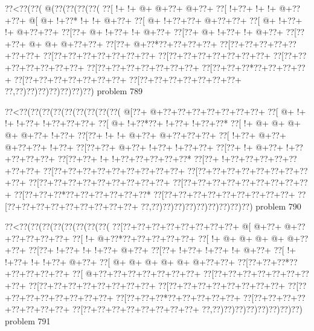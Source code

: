 \vbox{\vbox{\goo
\0??<\0??(\0??(\- @(\0??(\0??(\0??(\0??(
\0??[\- !+\- !+\- @+\- @+\0??+\- @+\0??+
\0??[\- !+\0??+\- !+\- !+\- @+\0??+\0??+
\- @[\- @+\- !+\0??*\- !+\- !+\- @+\0??+
\0??[\- @+\- !+\0??+\0??+\- @+\0??+\0??+
\0??[\- @+\- !+\0??+\- !+\- @+\0??+\0??+
\0??[\0??+\- @+\- !+\0??+\- !+\- @+\0??+
\0??[\0??+\- @+\- !+\0??+\- !+\- @+\0??+
\0??[\0??+\0??+\- @+\- @+\- @+\0??+\0??+
\0??[\0??+\- @+\0??*\0??+\0??+\0??+\0??+
\0??[\0??+\0??+\0??+\0??+\0??+\0??+\0??+
\0??[\0??+\0??+\0??+\0??+\0??+\0??+\0??+
\0??[\0??+\0??+\0??+\0??+\0??+\0??+\0??+
\0??[\0??+\0??+\0??+\0??+\0??+\0??+\0??+
\0??[\0??+\0??+\0??+\0??+\0??+\0??+\0??+
\0??[\0??+\0??+\0??*\0??+\0??+\0??+\0??+
\0??[\0??+\0??+\0??+\0??+\0??+\0??+\0??+
\0??[\0??+\0??+\0??+\0??+\0??+\0??+\0??+
\0??,\0??)\0??)\0??)\0??)\0??)\0??)\0??)
}
\hfil problem 789\hfil\break
}

\vbox{\vbox{\goo
\0??<\0??(\0??(\0??(\0??(\0??(\0??(\0??(\0??(\0??(
\- @[\0??+\- @+\0??+\0??+\0??+\0??+\0??+\0??+\0??+
\0??[\- @+\- !+\- !+\- !+\0??+\- !+\0??+\0??+\0??+
\0??[\- @+\- !+\0??*\0??+\- !+\0??+\- !+\0??+\0??*
\0??[\- !+\- @+\- @+\- @+\- @+\- @+\0??+\- !+\0??+
\0??[\0??+\- !+\- !+\- @+\0??+\- @+\0??+\0??+\0??+
\0??[\- !+\0??+\- @+\0??+\- @+\0??+\0??+\- !+\0??+
\0??[\0??+\0??+\- @+\0??+\- !+\0??+\- !+\0??+\0??+
\0??[\0??+\- !+\- @+\0??+\- !+\0??+\0??+\0??+\0??+
\0??[\0??+\0??+\- !+\- !+\0??+\0??+\0??+\0??+\0??*
\0??[\0??+\- !+\0??+\0??+\0??+\0??+\0??+\0??+\0??+
\0??[\0??+\0??+\0??+\0??+\0??+\0??+\0??+\0??+\0??+
\0??[\0??+\0??+\0??+\0??+\0??+\0??+\0??+\0??+\0??+
\0??[\0??+\0??+\0??+\0??+\0??+\0??+\0??+\0??+\0??+
\0??[\0??+\0??+\0??+\0??+\0??+\0??+\0??+\0??+\0??+
\0??[\0??+\0??+\0??*\0??+\0??+\0??+\0??+\0??+\0??*
\0??[\0??+\0??+\0??+\0??+\0??+\0??+\0??+\0??+\0??+
\0??[\0??+\0??+\0??+\0??+\0??+\0??+\0??+\0??+\0??+
\0??,\0??)\0??)\0??)\0??)\0??)\0??)\0??)\0??)\0??)
}
\hfil problem 790\hfil\break
}

\vbox{\vbox{\goo
\0??<\0??(\0??(\0??(\0??(\0??(\0??(\0??(\0??(
\0??[\0??+\0??+\0??+\0??+\0??+\0??+\0??+\0??+
\- @[\- @+\0??+\- @+\0??+\0??+\0??+\0??+\0??+
\0??[\- !+\- @+\0??*\0??+\0??+\0??+\0??+\0??+
\0??[\- !+\- @+\- @+\- @+\- @+\- @+\0??+\0??+
\0??[\0??+\- !+\0??+\- !+\- !+\0??+\- @+\0??+
\0??[\0??+\- !+\0??+\- !+\0??+\- !+\- @+\0??+
\0??[\- !+\- !+\0??+\- !+\- !+\0??+\- @+\0??+
\0??[\- @+\- @+\- @+\- @+\- @+\- @+\0??+\0??+
\0??[\0??+\0??+\0??*\0??+\0??+\0??+\0??+\0??+
\0??[\- @+\0??+\0??+\0??+\0??+\0??+\0??+\0??+
\0??[\0??+\0??+\0??+\0??+\0??+\0??+\0??+\0??+
\0??[\0??+\0??+\0??+\0??+\0??+\0??+\0??+\0??+
\0??[\0??+\0??+\0??+\0??+\0??+\0??+\0??+\0??+
\0??[\0??+\0??+\0??+\0??+\0??+\0??+\0??+\0??+
\0??[\0??+\0??+\0??*\0??+\0??+\0??+\0??+\0??+
\0??[\0??+\0??+\0??+\0??+\0??+\0??+\0??+\0??+
\0??[\0??+\0??+\0??+\0??+\0??+\0??+\0??+\0??+
\0??,\0??)\0??)\0??)\0??)\0??)\0??)\0??)\0??)
}
\hfil problem 791\hfil\break
}

